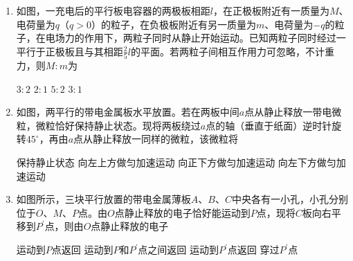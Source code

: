 
\begin{enumerate}[leftmargin=0em]
\renewcommand{\labelenumi}{\arabic{enumi}.}
\item
{}
如图，一充电后的平行板电容器的两极板相距$ l $，在正极板附近有一质量为$ M $、电荷量为$ q $（$ q > 0 $）的粒子，在负极板附近有另一质量为$ m $、电荷量为$ -q $的粒子，在电场力的作用下，两粒子同时从静止开始运动。已知两粒子同时经过一平行于正极板且与其相距$ \frac{ 2 }{ 5 } l $的平面。若两粒子间相互作用力可忽略，不计重力，则$ M : m $为  
\begin{figure}[h!]
\centering

\end{figure}

\fourchoices
{$ 3:2 $}
{$ 2:1 $}
{$ 5:2 $}
{$ 3:1 $}




\item
{}
如图，两平行的带电金属板水平放置。若在两板中间$ a $点从静止释放一带电微粒，微粒恰好保持静止状态。现将两板绕过$ a $点的轴（垂直于纸面）逆时针旋转$ 45 ^{ \circ } $，再由$ a $点从静止释放一同样的微粒，该微粒将  
\begin{figure}[h!]
\centering

\end{figure}


\fourchoices
{保持静止状态 }
{向左上方做匀加速运动}
{向正下方做匀加速运动}
{向左下方做匀加速运动}





\item
{}
如图所示，三块平行放置的带电金属薄板$ A $、$ B $、$ C $中央各有一小孔，小孔分别位于$ O $、$ M $、$ P $点。由$ O $点静止释放的电子恰好能运动到$ P $点，现将$ C $板向右平移到$ P ^{\prime} $点，则由$ O $点静止释放的电子  
\begin{figure}[h!]
\centering

\end{figure}


\fourchoices
{运动到$ P $点返回}
{运动到$ P $和$ P ^{\prime} $点之间返回}
{运动到$ P ^{\prime} $点返回}
{穿过$ P ^{\prime} $点}






\end{enumerate}
